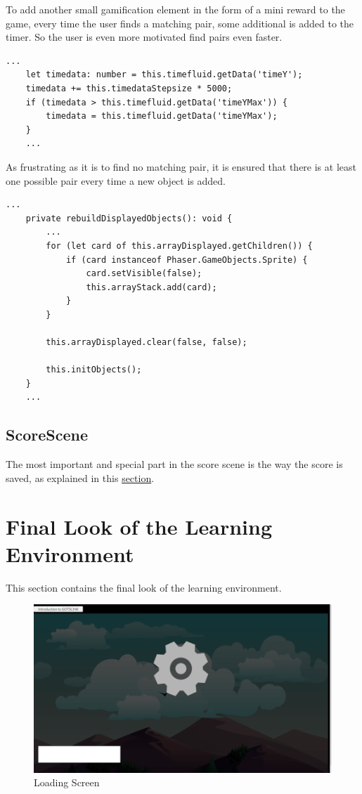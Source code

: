 To add another small gamification element in the form of a mini reward to the game, every time the user finds a matching
pair, some additional is added to the timer. So the user is even more motivated find pairs even faster.

\begin{lstlisting}[style=TypeScript, caption={updateProgressbar (gameScene.ts)}]
    ...
    let timedata: number = this.timefluid.getData('timeY');
    timedata += this.timedataStepsize * 5000;
    if (timedata > this.timefluid.getData('timeYMax')) {
        timedata = this.timefluid.getData('timeYMax');
    }
    ...
\end{lstlisting}

As frustrating as it is to find no matching pair,
it is ensured that there is at least one possible pair every time a new object is added.

\begin{lstlisting}[style=TypeScript, caption={INSERT (gameScene.ts)}]
    ...
    private rebuildDisplayedObjects(): void {
        ...
        for (let card of this.arrayDisplayed.getChildren()) {
            if (card instanceof Phaser.GameObjects.Sprite) {
                card.setVisible(false);
                this.arrayStack.add(card);
            }
        }

        this.arrayDisplayed.clear(false, false);

        this.initObjects();
    }
    ...
\end{lstlisting}

\subsection{ScoreScene}\label{subsec:scorescene}
The most important and special part in the score scene is the way the score is saved,
as explained in this \hyperref[sec:scorestorage]{section}.

\section{Final Look of the Learning Environment}\label{sec:final-look-of-the-learning-environment}
This section contains the final look of the learning environment.

\begin{figure}[H]
    \centering
    \includegraphics[width=1\textwidth]{figures/loadingscreen}
    \caption{Loading Screen}
    \label{fig:loadingscreen}
\end{figure}

